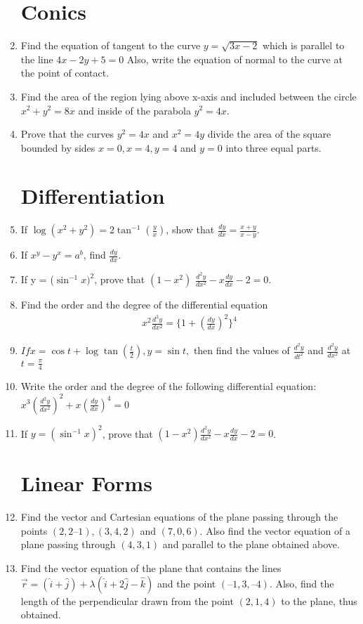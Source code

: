 \documentclass{article}
\begin{document}
\begin{enumerate}
\section{Conics}
\item Find the equation of tangent to the curve $y=\sqrt{3x-2}$ which is parallel to the line $4x-2y+5=0$ Also, write the equation of normal to the curve at the point of contact.
\item Find the area of the region lying above x-axis and included between the circle $x^2 + y^2 = 8x$  and inside of the parabola $y^2 = 4x$.
\item Prove that the curves $y^2 = 4x$ and $x^2 = 4y$ divide the area of the square bounded by sides $x = 0, x = 4, y = 4$ and $y = 0$ into three equal parts.
\section{Differentiation}
\item If $\log(x^2+y^2)=2 \tan^{-1} (\frac{y}{x})$, show that $\frac{dy}{dx}=\frac{x+y}{x-y}$.
\item If ${x^y-y^x}=a^b$, find $\frac{dy}{dx}$.
\item If y = ($\sin^{-1}x)^2$, prove that $(1-x^2)$ $\frac{d^2y}{dx^2}-x\frac{dy}{dx}-2=0$.
\item Find the order and the degree of the differential equation
\begin{align*}
x^{2}\frac{d^{2}y}{dx^{2}}=\{1+(\frac{dy}{dx})^{2}\}^{4}
\end{align*}
\item $If x = \cos t + \log \tan(\frac{t}{2}),y=\sin t, $ then find the values of $\frac{d^2y}{dt^2}$ and $\frac{d^2y}{dx^2}$ at $t= \frac{\pi}{4}$
\item Write the order and the degree of the following differential equation: $x^3(\frac{d^2y}{dx^2})^2 +x(\frac{dy}{dx})^4 = 0 $
\item If $y=(\sin^{-1}x)^2$, prove that $(1-x^2)\frac{d^2y}{dx^2}-x \frac{dy}{dx}-2=0$.
\section{Linear Forms}
\item Find the vector and Cartesian equations of the plane passing through the points $(2, 2 –1), (3, 4, 2)$ and $(7, 0, 6)$. Also find the vector equation of a plane passing through $(4, 3, 1)$ and parallel to the plane obtained above.
\item Find the vector equation of the plane that contains the lines $\Vec{r}=(\hat{i}+\hat{j})+\lambda(\hat{i}+2\hat{j}-\hat{k})$ and the point $(–1, 3, – 4)$. Also, find the length of the perpendicular drawn from the point $(2, 1, 4)$ to the plane, thus obtained.

\end{enumerate}
\end{document}
